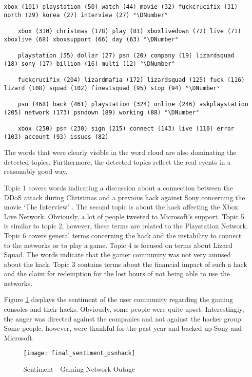 \begin{lstlisting}[caption={[Topic Model for Christmas Network Outage] Topic Model for Christmas Network Outage}, label={lst:topic-model-network}, float=h]
	xbox (101) playstation (50) watch (44) movie (32) fuckcrucifix (31) north (29) korea (27) interview (27) °\DNumber°

	xbox (310) christmas (178) play (81) xboxlivedown (72) live (71) xboxlive (68) xboxsupport (66) day (63) °\DNumber°

	playstation (55) dollar (27) psn (20) company (19) lizardsquad (18) sony (17) billion (16) multi (12) °\DNumber°

	fuckcrucifix (204) lizardmafia (172) lizardsquad (125) fuck (116) lizard (108) squad (102) finestsquad (95) stop (94) °\DNumber°

	psn (468) back (461) playstation (324) online (246) askplaystation (205) network (173) psndown (89) working (88) °\DNumber°

	xbox (250) psn (230) sign (215) connect (143) live (110) error (103) account (93) issues (82)
\end{lstlisting}

The words that were clearly visible in the word cloud are also dominating the detected topics. Furthermore, the detected topics reflect the real events in a reasonably good way.

Topic 1 covers words indicating a discussion about a connection between the DDoS attack during Christmas and a previous hack against Sony concerning the movie ‘The Interview’ \cite{bbc2014the}. The second topic is about the hack affecting the Xbox Live Network. Obviously, a lot of people tweeted to Microsoft's support. Topic 5 is similar to topic 2, however, these terms are related to the Playstation Network. Topic 6 covers general terms concerning the hack and the instability to connect to the networks or to play a game. Topic 4 is focused on terms about Lizard Squad. The words indicate that the gamer community was not very amused about the hack. Topic 3 contains terms about the financial impact of such a hack and the claim for redemption for the lost hours of not being able to use the networks.

Figure \ref{fig:network-outage-sentiment} displays the sentiment of the user community regarding the gaming consoles and their hacks. Obviously, some people were quite upset. Interestingly, the anger was directed against the companies and not against the hacker group. Some people, however, were thankful for the past year and backed up Sony and Microsoft.

\begin{figure}[H]
  \centering
        \texttt{[image: final\_sentiment\_psnhack]}
  \caption[Sentiment - Gaming Network Outage]{Sentiment - Gaming Network Outage}
  \label{fig:network-outage-sentiment}
  \vspace{-1.3em}
\end{figure}